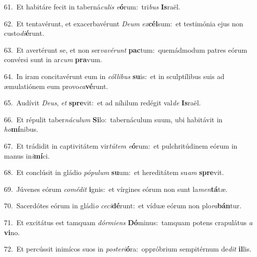 {\numbfont\textcolor{\numbcolor}{61.}}~Et habitáre fecit in taberná\-\textit{cu}\-\textit{lis} \textit{e}\-\textbf{ó}rum:~\star tri\textit{bus} \textbf{Is}\-raël.\par
{\numbfont\textcolor{\numbcolor}{62.}}~Et tentavérunt, et exacerbavérunt \textit{De}\-\textit{um} \textit{ex}\-\textbf{cél}sum:~\star et testimónia ejus non custo\-\textit{di}\-\textbf{é}runt.\par
{\numbfont\textcolor{\numbcolor}{63.}}~Et avertérunt se, et non ser\-\textit{va}\-\textit{vé}\textit{runt} \textbf{pac}\-tum:~\star quemádmodum patres eórum convérsi sunt in ar\textit{cum} \textbf{pra}\-vum.\par
{\numbfont\textcolor{\numbcolor}{64.}}~In iram concitavérunt eum in \textit{cól}\-\textit{li}\textit{bus} \textbf{su}\-is:~\star et in sculptílibus suis ad æmulatiónem eum provo\-\textit{ca}\-\textbf{vé}runt.\par
{\numbfont\textcolor{\numbcolor}{65.}}~Audívit \textit{De}\-\textit{us}, \textit{et} \textbf{spre}\-vit:~\star et ad níhilum redégit val\textit{de} \textbf{Is}\-raël.\par
{\numbfont\textcolor{\numbcolor}{66.}}~Et répulit taber\-\textit{ná}\-\textit{cu}\textit{lum} \textbf{Si}\-lo:~\star tabernáculum suum, ubi habitávit in \textit{ho}\-\textbf{mí}nibus.\par
{\numbfont\textcolor{\numbcolor}{67.}}~Et trádidit in captivitátem vir\-\textit{tú}\-\textit{tem} \textit{e}\-\textbf{ó}rum:~\star et pulchritúdinem eórum in manus in\-\textit{i}\-\textbf{mí}ci.\par
{\numbfont\textcolor{\numbcolor}{68.}}~Et conclúsit in gládio \textit{pó}\-\textit{pu}\textit{lum} \textbf{su}\-um:~\star et hereditátem su\textit{am} \textbf{spre}\-vit.\par
{\numbfont\textcolor{\numbcolor}{69.}}~Júvenes eórum \textit{com}\-\textit{é}\textit{dit} \textbf{i}\-gnis:~\star et vírgines eórum non sunt la\-\textit{men}\-\textbf{tá}tæ.\par
{\numbfont\textcolor{\numbcolor}{70.}}~Sacerdótes eórum in gládi\textit{o} \textit{ce}\-\textit{ci}\textbf{dé}runt:~\star et víduæ eórum non plo\-\textit{ra}\-\textbf{bán}tur.\par
{\numbfont\textcolor{\numbcolor}{71.}}~Et excitátus est tamquam \textit{dór}\-\textit{mi}\textit{ens} \textbf{Dó}\-minus:~\star tamquam potens crapulátus \textit{a} \textbf{vi}\-no.\par
{\numbfont\textcolor{\numbcolor}{72.}}~Et percússit inimícos suos in \textit{post}\-\textit{e}\textit{ri}\textbf{ó}ra:~\star oppróbrium sempitérnum de\textit{dit} \textbf{il}\-lis.\par
